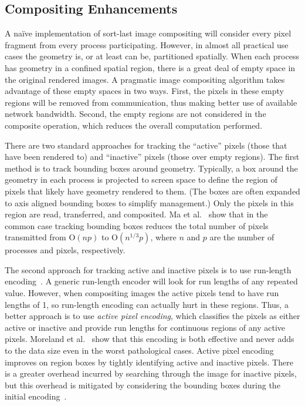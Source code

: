 \documentclass{acm_proc_article-sp}
\newcommand*{\lcite}[1]{~\cite{#1}}
\newcommand*{\scite}[1]{~\cite{#1}}
\newcommand{\etal}{et al.}
\newcommand*{\keyterm}[1]{\emph{#1}}
\newcommand{\Oh}{\mathrm{O}}
\begin{document}
\subsection{Compositing Enhancements}
\label{sec:CompositingEnhancements}

A na\"{i}ve implementation of sort-last image compositing will consider
every pixel fragment from every process participating.  However, in almost
all practical use cases the geometry is, or at least can be, partitioned
spatially.  When each process has geometry in a confined spatial region,
there is a great deal of empty space in the original rendered images.  A
pragmatic image compositing algorithm takes advantage of these empty spaces
in two ways.  First, the pixels in these empty regions will be removed from
communication, thus making better use of available network bandwidth.
Second, the empty regions are not considered in the composite operation,
which reduces the overall computation performed.

There are two standard approaches for tracking the ``active'' pixels (those
that have been rendered to) and ``inactive'' pixels (those over empty
regions).  The first method is to track bounding boxes around geometry.
Typically, a box around the geometry in each process is projected to screen
space to define the region of pixels that likely have geometry rendered to
them.  (The boxes are often expanded to axis aligned bounding boxes to
simplify management.)  Only the pixels in this region are read,
transferred, and composited.  Ma \etal\scite{BinarySwap2} show that in the
common case tracking bounding boxes reduces the total number of pixels
transmitted from $\Oh(n p)$ to $\Oh(n^{1/3} p)$, where $n$ and $p$ are the
number of processes and pixels, respectively.

The second approach for tracking active and inactive pixels is to use
run-length encoding\lcite{Ahrens1998}.  A generic run-length encoder
will look for run lengths of any repeated value.  However, when compositing
images the active pixels tend to have run lengths of 1, so run-length
encoding can actually hurt in these regions.  Thus, a better approach is to
use \keyterm{active pixel encoding}, which classifies the pixels as either
active or inactive and provide run lengths for continuous regions of any
active pixels.  Moreland \etal\scite{Moreland2001} show that this
encoding is both effective and never adds to the data size even in the
worst pathological cases.  Active pixel encoding improves on region boxes
by tightly identifying active and inactive pixels.  There is a greater
overhead incurred by searching through the image for inactive pixels, but
this overhead is mitigated by considering the bounding boxes during the
initial encoding\lcite{Yang1999}.
\end{document}
